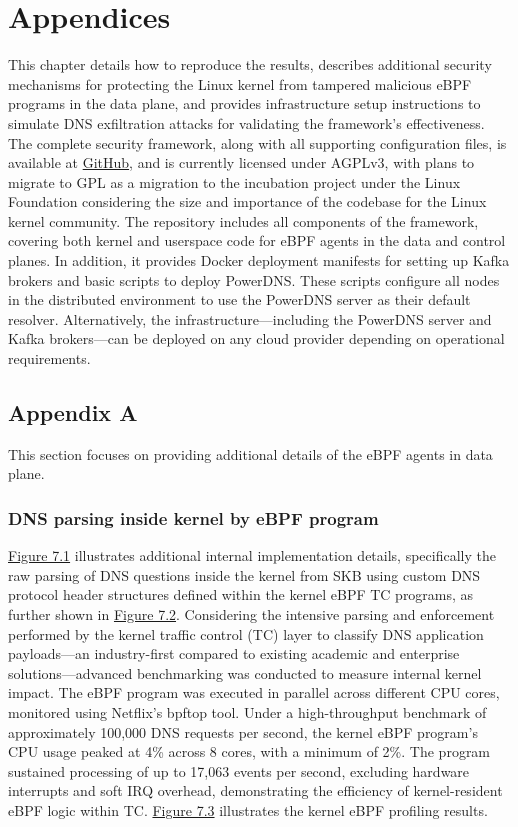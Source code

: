 \documentclass [11pt, proquest] {uwthesis}[2020/02/24]
\begin{document}
 





\chapter{Appendices}

This chapter details how to reproduce the results, describes additional security mechanisms for protecting the Linux kernel from tampered malicious eBPF programs in the data plane, and provides infrastructure setup instructions to simulate DNS exfiltration attacks for validating the framework’s effectiveness.
The complete security framework, along with all supporting configuration files, is available at \href{https://github.com/Synarcs/DNSObelisk}{GitHub}, and is currently licensed under AGPLv3, with plans to migrate to GPL as a migration to the incubation project under the Linux Foundation considering the size and importance of the codebase for the Linux kernel community. The repository includes all components of the framework, covering both kernel and userspace code for eBPF agents in the data and control planes. In addition, it provides Docker deployment manifests for setting up Kafka brokers and basic scripts to deploy PowerDNS. These scripts configure all nodes in the distributed environment to use the PowerDNS server as their default resolver. Alternatively, the infrastructure—including the PowerDNS server and Kafka brokers—can be deployed on any cloud provider depending on operational requirements.


\section{Appendix A}
This section focuses on providing additional details of the eBPF agents in data plane.

\subsection{DNS parsing inside kernel by eBPF  program}
\hyperref[fig:c1]{Figure 7.1} illustrates additional internal implementation details, specifically the raw parsing of DNS questions inside the kernel from SKB using custom DNS protocol header structures defined within the kernel eBPF TC programs, as further shown in \hyperref[fig:c2]{Figure 7.2}. Considering the intensive parsing and enforcement performed by the kernel traffic control (TC) layer to classify DNS application payloads—an industry-first compared to existing academic and enterprise solutions—advanced benchmarking was conducted to measure internal kernel impact. The eBPF program was executed in parallel across different CPU cores, monitored using Netflix’s bpftop tool. Under a high-throughput benchmark of approximately 100,000 DNS requests per second, the kernel eBPF program’s CPU usage peaked at 4\% across 8 cores, with a minimum of 2\%. The program sustained processing of up to 17,063 events per second, excluding hardware interrupts and soft IRQ overhead, demonstrating the efficiency of kernel-resident eBPF logic within TC. \hyperref[fig:c3]{Figure 7.3} illustrates the kernel eBPF profiling results.
\end{document}
